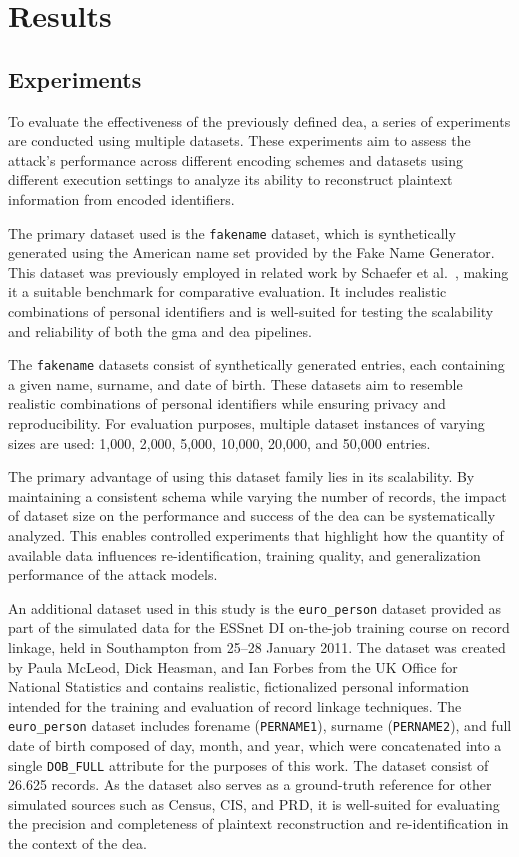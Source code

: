 
\chapter{Results}  \label{sec:results}


\section{Experiments}  \label{sec:experiments}

To evaluate the effectiveness of the previously defined \ac{dea}, a series of experiments are conducted using multiple datasets.
These experiments aim to assess the attack’s performance across different encoding schemes and datasets using different execution settings to analyze its ability to reconstruct plaintext information from encoded identifiers.

The primary dataset used is the \texttt{fakename} dataset, which is synthetically generated using the American name set provided by the Fake Name Generator.
This dataset was previously employed in related work by Schaefer et al.~\cite{schaefer2024}, making it a suitable benchmark for comparative evaluation.
It includes realistic combinations of personal identifiers and is well-suited for testing the scalability and reliability of both the \ac{gma} and \ac{dea} pipelines.

The \texttt{fakename} datasets consist of synthetically generated entries, each containing a given name, surname, and date of birth.
These datasets aim to resemble realistic combinations of personal identifiers while ensuring privacy and reproducibility.
For evaluation purposes, multiple dataset instances of varying sizes are used: 1{,}000, 2{,}000, 5{,}000, 10{,}000, 20{,}000, and 50{,}000 entries.

The primary advantage of using this dataset family lies in its scalability.
By maintaining a consistent schema while varying the number of records, the impact of dataset size on the performance and success of the \ac{dea} can be systematically analyzed.
This enables controlled experiments that highlight how the quantity of available data influences re-identification, training quality, and generalization performance of the attack models.

An additional dataset used in this study is the \texttt{euro\_person} dataset provided as part of the simulated data for the ESSnet DI on-the-job training course on record linkage, held in Southampton from 25--28 January 2011.
The dataset was created by Paula McLeod, Dick Heasman, and Ian Forbes from the UK Office for National Statistics and contains realistic, fictionalized personal information intended for the training and evaluation of record linkage techniques.
The \texttt{euro\_person} dataset includes forename (\texttt{PERNAME1}), surname (\texttt{PERNAME2}), and full date of birth composed of day, month, and year, which were concatenated into a single \texttt{DOB\_FULL} attribute for the purposes of this work.
The dataset consist of 26.625 records.
As the dataset also serves as a ground-truth reference for other simulated sources such as Census, CIS, and PRD, it is well-suited for evaluating the precision and completeness of plaintext reconstruction and re-identification in the context of the \ac{dea}.

